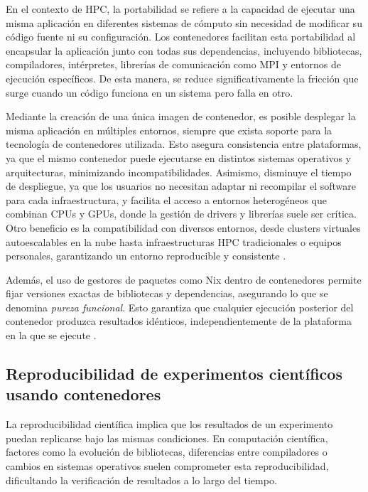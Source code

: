 En el contexto de \acs{HPC}, la portabilidad se refiere a la capacidad de ejecutar una misma aplicación en diferentes sistemas de cómputo sin necesidad de modificar su código fuente ni su configuración. Los contenedores facilitan esta portabilidad al encapsular la aplicación junto con todas sus dependencias, incluyendo bibliotecas, compiladores, intérpretes, librerías de comunicación como MPI y entornos de ejecución específicos. De esta manera, se reduce significativamente la fricción que surge cuando un código funciona en un sistema pero falla en otro.

Mediante la creación de una única imagen de contenedor, es posible desplegar la misma aplicación en múltiples entornos, siempre que exista soporte para la tecnología de contenedores utilizada. Esto asegura consistencia entre plataformas, ya que el mismo contenedor puede ejecutarse en distintos sistemas operativos y arquitecturas, minimizando incompatibilidades. Asimismo, disminuye el tiempo de despliegue, ya que los usuarios no necesitan adaptar ni recompilar el software para cada infraestructura, y facilita el acceso a entornos heterogéneos que combinan CPUs y GPUs, donde la gestión de drivers y librerías suele ser crítica. Otro beneficio es la compatibilidad con diversos entornos, desde clusters virtuales autoescalables en la nube hasta infraestructuras \acs{HPC} tradicionales o equipos personales, garantizando un entorno reproducible y consistente \cite{Vaillancourt2020SelfScalingCA}.

Además, el uso de gestores de paquetes como Nix dentro de contenedores permite fijar versiones exactas de bibliotecas y dependencias, asegurando lo que se denomina \textit{pureza funcional}. Esto garantiza que cualquier ejecución posterior del contenedor produzca resultados idénticos, independientemente de la plataforma en la que se ejecute \cite{Vaillancourt2020SelfScalingCA}.

\subsection{Reproducibilidad de experimentos científicos usando contenedores}

La reproducibilidad científica implica que los resultados de un experimento puedan replicarse bajo las mismas condiciones. En computación científica, factores como la evolución de bibliotecas, diferencias entre compiladores o cambios en sistemas operativos suelen comprometer esta reproducibilidad, dificultando la verificación de resultados a lo largo del tiempo.

